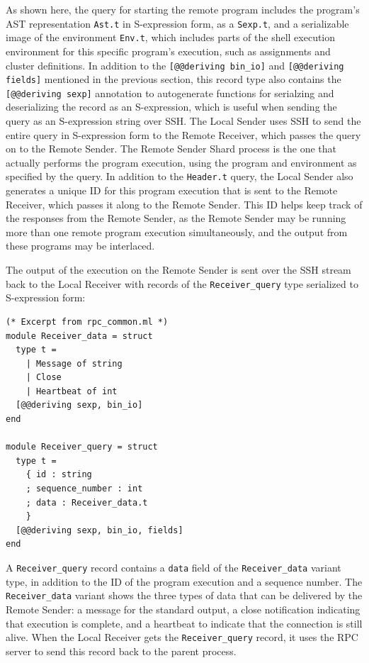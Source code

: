 \documentclass[oneside]{report}
\begin{document}
As shown here, the query for starting the remote program includes the program's AST representation \texttt{Ast.t} in S-expression form, as a \texttt{Sexp.t}, and a serializable image of the environment \texttt{Env.t}, which includes parts of the shell execution environment for this specific program's execution, such as assignments and cluster definitions.
In addition to the \texttt{[@@deriving bin\_io]} and \texttt{[@@deriving fields]} mentioned in the previous section, this record type also contains the \texttt{[@@deriving sexp]} annotation to autogenerate functions for serialzing and deserializing the record as an S-expression, which is useful when sending the query as an S-expression string over SSH.
The Local Sender uses SSH to send the entire query in S-expression form to the Remote Receiver, which passes the query on to the Remote Sender.
The Remote Sender Shard process is the one that actually performs the program execution, using the program and environment as specified by the query.
In addition to the \texttt{Header.t} query, the Local Sender also generates a unique ID for this program execution that is sent to the Remote Receiver, which passes it along to the Remote Sender.
This ID helps keep track of the responses from the Remote Sender, as the Remote Sender may be running more than one remote program execution simultaneously, and the output from these programs may be interlaced.

The output of the execution on the Remote Sender is sent over the SSH stream back to the Local Receiver with records of the \texttt{Receiver\_query} type serialized to S-expression form:

\begin{minipage}[c]{\textwidth-15pt}
  \begin{lstlisting}
(* Excerpt from rpc_common.ml *)
module Receiver_data = struct
  type t =
    | Message of string
    | Close
    | Heartbeat of int
  [@@deriving sexp, bin_io]
end

module Receiver_query = struct
  type t =
    { id : string
    ; sequence_number : int
    ; data : Receiver_data.t
    }
  [@@deriving sexp, bin_io, fields]
end
\end{lstlisting}
  \smallskip
\end{minipage}

A \texttt{Receiver\_query} record contains a \texttt{data} field of the \texttt{Receiver\_data} variant type, in addition to the ID of the program execution and a sequence number.
The \texttt{Receiver\_data} variant shows the three types of data that can be delivered by the Remote Sender: a message for the standard output, a close notification indicating that execution is complete, and a heartbeat to indicate that the connection is still alive.
When the Local Receiver gets the \texttt{Receiver\_query} record, it uses the RPC server to send this record back to the parent process.
\end{document}
